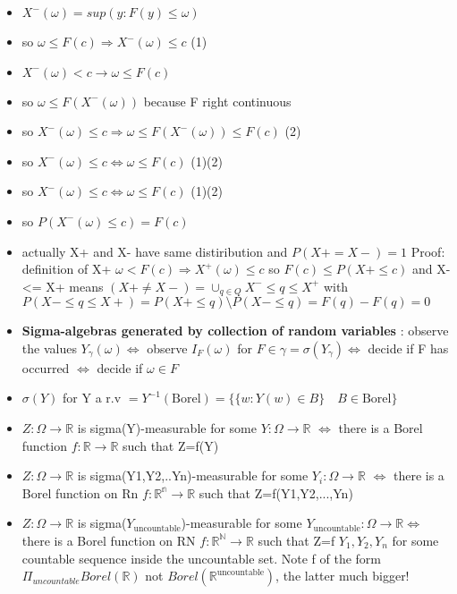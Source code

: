 \documentclass[10pt,landscape,a4paper]{article}
\begin{document}
\begin{multicols*}{3}
\begin{spacing}{0.5}
\begin{itemize}
\item $X^-(\omega) = sup (y : F(y) \le \omega) $
\item so $\omega \le F(c) \Rightarrow X^-(\omega) \le c$ (1)
\item  $X^-(\omega) < c \rightarrow \omega \le F(c)$
\item  so $\omega \le F  (  X^-(\omega) ) $ because F right continuous
\item  so $X^-(\omega) \le c \Rightarrow \omega \le F  (  X^-(\omega) ) \le F(c) $ (2)
\item  so $X^-(\omega) \le c \Leftrightarrow \omega \le F(c)  $ (1)(2)
\item  so $X^-(\omega) \le c \Leftrightarrow \omega \le F(c)  $ (1)(2)
\item  so $ P (X^-(\omega) \le c)  = F(c)  $
\item   actually X+ and X- have same distiribution and $P (X+=X-) =1$ Proof: definition of X+ $\omega < F(c) \Rightarrow X^+(\omega) \le c$ so $F(c) \le P(X+ \le c)$ and X-<= X+ means $ (X+ \ne X-) = \cup_{q \in Q} X^- \le q \le X^+$ with $P (X- \le q \le X+) = P(X+ \le q) \setminus P(X- \le q) = F(q) - F(q) = 0$

\item \textbf{Sigma-algebras generated by collection of random variables} : observe the values $Y_{\gamma}(\omega) \Leftrightarrow$ observe $I_F(\omega)$ for $F \in \gamma = \sigma(Y_{\gamma}) \Leftrightarrow$ decide if F has occurred $\Leftrightarrow$ decide if $\omega \in F$ 
\item $\sigma(Y)$ for Y a r.v $=Y^{-1}(\text{Borel}) = \big\{\{w : Y(w) \in B \} \quad B \in \text{Borel} \big\}$
\item $Z : \Omega \rightarrow \mathbb{R}$ is sigma(Y)-measurable for some $Y : \Omega \rightarrow \mathbb{R}$ $\Leftrightarrow$ there is a Borel function $ f: \mathbb{R} \rightarrow \mathbb{R}$ such that Z=f(Y)
\item $Z : \Omega \rightarrow \mathbb{R}$ is sigma(Y1,Y2,..Yn)-measurable for some $Y_i : \Omega \rightarrow \mathbb{R}$ $\Leftrightarrow$ there is a Borel function on Rn $ f: \mathbb{R^n} \rightarrow \mathbb{R}$ such that Z=f(Y1,Y2,...,Yn)

\item $ Z : \Omega \rightarrow \mathbb{R}$ is sigma($Y_{\text{uncountable}}$)-measurable for some $Y_{\text{uncountable}} : \Omega \rightarrow \mathbb{R} \Leftrightarrow$  there is a Borel function on RN  $ f: \mathbb{R^N} \rightarrow \mathbb{R} $  such that Z=f $Y_{1},Y_{2},Y_{n}$ for some countable sequence inside the uncountable set. Note f of the form $\Pi_{uncountable} Borel(\mathbb{R})$ not $Borel(\mathbb{R}^{\text{uncountable}})$, the latter much bigger!


\end{itemize}
\end{spacing}
\end{multicols*}
\end{document}
